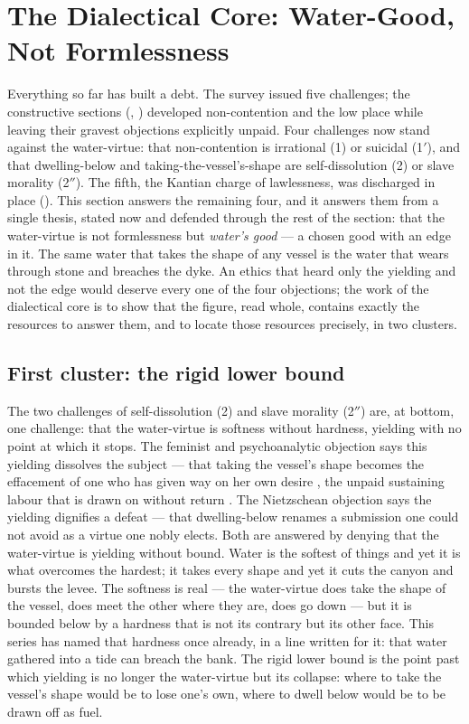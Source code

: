 \section{The Dialectical Core: Water-Good, Not Formlessness}
\label{p20:sec:dialectic}

\noindent
Everything so far has built a debt. The survey issued five challenges; the constructive sections (, ) developed non-contention and the low place while leaving their gravest objections explicitly unpaid. Four challenges now stand against the water-virtue: that non-contention is irrational (1) or suicidal (1$'$), and that dwelling-below and taking-the-vessel's-shape are self-dissolution (2) or slave morality (2$''$). The fifth, the Kantian charge of lawlessness, was discharged in place (). This section answers the remaining four, and it answers them from a single thesis, stated now and defended through the rest of the section: that the water-virtue is not formlessness but \emph{water's good} --- a chosen good with an edge in it. The same water that takes the shape of any vessel is the water that wears through stone and breaches the dyke. An ethics that heard only the yielding and not the edge would deserve every one of the four objections; the work of the dialectical core is to show that the figure, read whole, contains exactly the resources to answer them, and to locate those resources precisely, in two clusters.

\subsection{First cluster: the rigid lower bound}
\label{p20:sub:dialectic-bound}

The two challenges of self-dissolution (2) and slave morality (2$''$) are, at bottom, one challenge: that the water-virtue is softness without hardness, yielding with no point at which it stops. The feminist and psychoanalytic objection says this yielding dissolves the subject --- that taking the vessel's shape becomes the effacement of one who has given way on her own desire \parencite{lacan2006}, the unpaid sustaining labour that is drawn on without return \parencite{federici2004}. The Nietzschean objection says the yielding dignifies a defeat --- that dwelling-below renames a submission one could not avoid as a virtue one nobly elects. Both are answered by denying that the water-virtue is yielding without bound. Water is the softest of things and yet it is what overcomes the hardest; it takes every shape and yet it cuts the canyon and bursts the levee. The softness is real --- the water-virtue does take the shape of the vessel, does meet the other where they are, does go down --- but it is bounded below by a hardness that is not its contrary but its other face. This series has named that hardness once already, in a line written for it: that water gathered into a tide can breach the bank. The rigid lower bound is the point past which yielding is no longer the water-virtue but its collapse: where to take the vessel's shape would be to lose one's own, where to dwell below would be to be drawn off as fuel.

